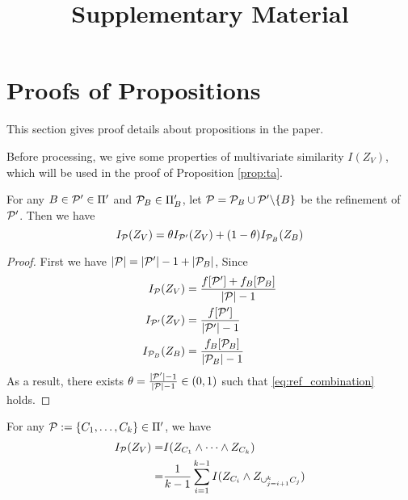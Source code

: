 \documentclass{article}
\title{Supplementary Material}
\begin{document}
\maketitle
\appendix
\section{Proofs of Propositions}
This section gives proof details about propositions in the paper.

Before processing, we give some properties of multivariate similarity $I(Z_V)$, which will be used in the proof of Proposition \ref{prop:ta}.
\begin{lemma}\label{lem:ref_combination}
For any $B \in \P' \in \Pi'$ and $\P_B \in \Pi'_B$, let $\P = \P_B \cup \P' \backslash \{B\} $
be the refinement of $\P'$. Then we have
\begin{equation}\label{eq:ref_combination}
I_{\P}(Z_V) = \theta I_{\P'}(Z_V) + (1-\theta) I_{\P_B}(Z_B)
\end{equation}
\end{lemma}
\begin{proof}
	First we have $\abs{\P} = \abs{\P'} -1 + \abs{\P_B}$,
	Since
	\begin{align*}
		I_{\P}(Z_V) & = { f[\P'] + f_B[\P_B] \over \abs{\P} - 1} \\
		I_{\P'}(Z_V) & = { f[\P'] \over \abs{\P'} - 1} \\
		I_{\P_B}(Z_B) & = { f_B[\P_B] \over \abs{\P_B} - 1}
	\end{align*}
	As a result, there exists $\theta = {\abs{\P'} - 1 \over \abs{\P} - 1} \in (0,1)$ such that 
	\eqref{eq:ref_combination} holds.
\end{proof}
\begin{lemma}\label{lem:mi_split}
For any $\P:=\{C_1, \dots, C_k\} \in \Pi'$, we have
\begin{align}
I_{\P}(Z_V) =& I(Z_{C_1} \wedge \dots \wedge Z_{C_k}) \label{eq:mmi_representation} \\
=& { 1 \over k-1} \sum_{i=1}^{k-1} I(Z_{C_i} \wedge Z_{\cup_{j=i+1}^k C_j}) \label{eq:mi_mmi}
\end{align}
\end{lemma}
\end{document}
